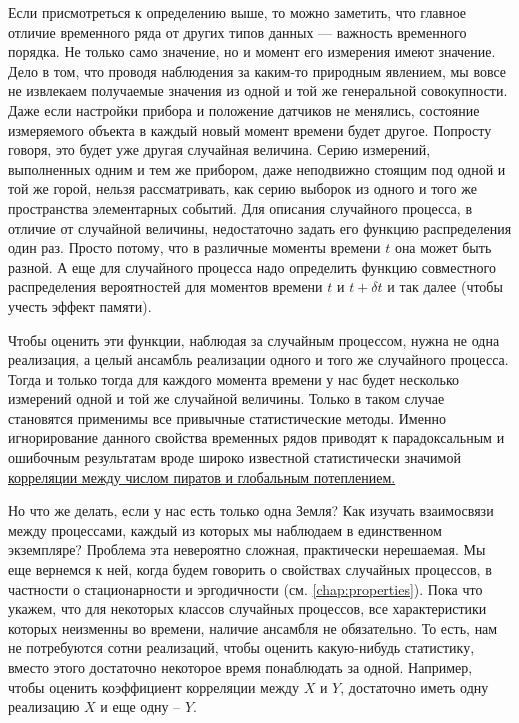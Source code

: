 
Если присмотреться к определению выше, то можно заметить,
что главное отличие временного ряда от
других типов данных — важность
временного порядка. Не только само значение, но и момент его
измерения имеют значение. Дело в том, что проводя наблюдения за
каким-то природным явлением, мы вовсе не
извлекаем получаемые значения из одной и той же генеральной
совокупности. Даже если
настройки прибора и положение датчиков не менялись, состояние
измеряемого объекта в каждый новый момент времени будет другое.
Попросту говоря, это будет уже другая случайная величина. Серию
измерений, выполненных одним и тем же прибором, даже неподвижно
стоящим под одной и той же горой, нельзя рассматривать, как серию
выборок из одного и того же пространства элементарных событий. Для
описания случайного процесса, в отличие от случайной величины,
недостаточно задать его функцию
распределения один раз. Просто потому, что в различные моменты времени
$t$ она может быть разной. А еще для случайного процесса надо
определить функцию совместного распределения вероятностей для
моментов времени $t$ и $t+\delta t$ и так далее (чтобы учесть эффект памяти).

Чтобы оценить эти функции, наблюдая за случайным процессом, нужна не
одна реализация, а целый
ансамбль реализации одного и того же случайного процесса. Тогда
и только тогда для каждого момента времени у нас будет несколько
измерений одной и той же случайной величины. Только в таком случае
становятся применимы все привычные статистические методы. Именно
игнорирование данного свойства временных рядов приводят к
парадоксальным и ошибочным результатам вроде широко известной
статистически значимой
\href{https://www.ntu.ac.uk/__data/assets/pdf_file/0038/676946/Fairhurst.pdf}{корреляции
между числом пиратов и глобальным потеплением.}


Но что же делать, если у нас есть только одна Земля? Как изучать
взаимосвязи между процессами, каждый из которых мы наблюдаем в
единственном экземпляре? Проблема эта невероятно сложная,
практически нерешаемая. Мы еще вернемся к ней, когда будем говорить
о свойствах случайных процессов, в частности о стационарности и
эргодичности (см. \autoref{chap:properties}).
Пока что укажем, что для некоторых классов случайных
процессов, все характеристики которых неизменны во времени, наличие
ансамбля не обязательно. То есть, нам не потребуются сотни
реализаций, чтобы оценить какую-нибудь статистику, вместо этого
достаточно некоторое время понаблюдать за одной. Например, чтобы
оценить коэффициент корреляции между $X$ и $Y$, достаточно иметь одну
реализацию $X$ и еще одну – $Y$.

